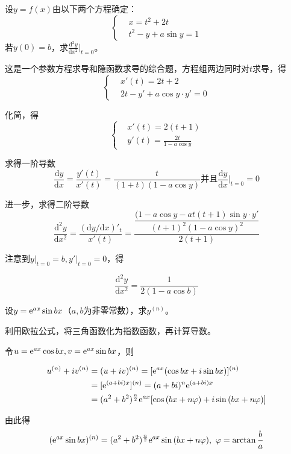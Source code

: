 \begin{problem}
	设$y=f(x)$由以下两个方程确定：
	\begin{equation*}
		\left\{ 
		\begin{aligned}
			&x=t^2+2t\\
			&t^2-y+a\sin{y}=1
		\end{aligned}
		\right.
	\end{equation*}
	若$y(0)=b$，求$\frac{\mathrm{d}^2y}{\mathrm{d}x^2}\Big|_{t=0}$。
	
	\begin{solution}
		这是一个参数方程求导和隐函数求导的综合题，方程组两边同时对$t$求导，得
		\begin{equation*}
			\left\{ 
			\begin{aligned}
				&x'(t)=2t+2\\
				&2t-y'+a\cos{y}\cdot y'=0
			\end{aligned}
			\right.
		\end{equation*}
	
		化简，得
		\begin{equation*}
			\left\{ 
			\begin{aligned}
				&x'(t)=2(t+1)\\
				&y'(t)=\frac{2t}{1-a\cos{y}}
			\end{aligned}
			\right.
		\end{equation*}
	
		求得一阶导数
		\[\frac{\mathrm{d}y}{\mathrm{d}x}=\frac{y'(t)}{x'(t)}=\frac{t}{(1+t)(1-a\cos{y})}\text{并且}\frac{\mathrm{d}y}{\mathrm{d}x}\Big|_{t=0}=0\]
		
		进一步，求得二阶导数
		\[\frac{\mathrm{d}^2y}{\mathrm{d}x^2}=\frac{(\mathrm{d}y/\mathrm{d}x)'_t}{x'(t)}=\frac{\dfrac{(1-a\cos{y}-at(t+1)\sin{y}\cdot y'}{(t+1)^2(1-a\cos{y})^2}}{2(t+1)}\]
		
		注意到$y\big|_{t=0}=b,y'\big|_{t=0}=0$，得
		
		\[\frac{\mathrm{d}^2y}{\mathrm{d}x^2}=\frac{1}{2(1-a\cos{b})}\]
	\end{solution}
\end{problem}

\begin{problem}
	设$y={\rm e}^{ax}\sin{bx}$（$a,b$为非零常数），求$y^{(n)}$。
	
	\begin{solution}
		利用欧拉公式，将三角函数化为指数函数，再计算导数。
		
		令$u={\rm e}^{ax}\cos{bx},v={\rm e}^{ax}\sin{bx}$，则
		
		\begin{align*}
			u^{(n)}+iv^{(n)}&=(u+iv)^{(n)}=[{\rm e}^{ax}(\cos{bx}+i\sin{bx})]^{(n)}\\
			&=[{\rm e}^{(a+bi)x}]^{(n)}=(a+bi)^n {\rm e}^{(a+bi)x}\\
			&=(a^2+b^2)^{\frac{n}{2}}{\rm e}^{ax}[\cos{(bx+n\varphi)}+i\sin{(bx+n\varphi)}]
		\end{align*}
		
		由此得
		\[({\rm e}^{ax}\sin{bx})^{(n)}=(a^2+b^2)^{\frac{n}{2}}{\rm e}^{ax}\sin{(bx+n\varphi)},~\varphi=\arctan{\frac{b}{a}}\]
	\end{solution}
\end{problem}

